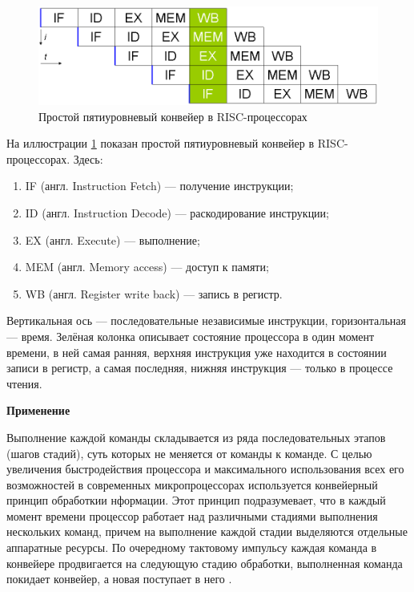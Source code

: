 \documentclass[a4paper, 14pt]{article}
\begin{document}
\begin{figure}[h]
\center
\includegraphics[scale=0.3]{risc.png}
\caption{Простой пятиуровневый конвейер в RISC-процессорах}
\label{ris:risc}
\end{figure}

На иллюстрации \ref{ris:risc} показан простой пятиуровневый конвейер в RISC-процессорах. Здесь:

\begin{enumerate}
\item[1)] IF (англ. Instruction Fetch) — получение инструкции;
\item[2)] ID (англ. Instruction Decode) — раскодирование инструкции;
\item[3)] EX (англ. Execute) — выполнение;
\item[4)] MEM (англ. Memory access) — доступ к памяти;
\item[5)] WB (англ. Register write back) — запись в регистр.
\end{enumerate}

Вертикальная ось — последовательные независимые инструкции, горизонтальная — время. Зелёная колонка описывает состояние процессора в один момент времени, в ней самая ранняя, верхняя инструкция уже находится в состоянии записи в регистр, а самая последняя, нижняя инструкция — только в процессе чтения.

\begin{center}
\large\textbf{Применение}
\end{center}
 

Выполнение каждой команды складывается из ряда последовательных этапов (шагов стадий), суть которых не меняется от команды к команде. С целью увеличения быстродействия процессора и максимального использования всех его возможностей в современных микропроцессорах используется конвейерный принцип обработкии нформации. Этот принцип подразумевает, что в каждый момент времени процессор работает над различными стадиями выполнения нескольких команд, причем на выполнение каждой стадии выделяются отдельные аппаратные ресурсы. По очередному тактовому импульсу каждая команда в конвейере продвигается на следующую стадию обработки, выполненная команда покидает конвейер, а новая поступает в него \cite{conveyor_risc}.
\end{document}
